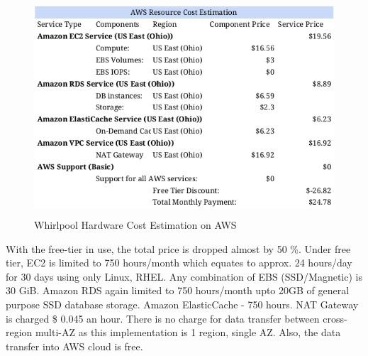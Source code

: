 \begin{figure}[h!]
  \centering
  \includegraphics[width=12cm,height=8cm,keepaspectratio]{../media/crawler/aws-resource-cost-estimation.png}
  \caption{Whirlpool Hardware Cost Estimation on AWS}
  \label{fig:awscost}
\end{figure}

\noindent
With the free-tier in use, the total price is dropped almost by 50 \%. Under free tier, EC2 is limited to 750 hours/month which equates to approx. 24 hours/day for 30 days using only Linux, RHEL. Any combination of EBS (SSD/Magnetic) is 30 GiB. Amazon RDS again limited to 750 hours/month upto 20GB of general purpose SSD database
storage. Amazon ElasticCache - 750 hours. NAT Gateway is charged \$ 0.045 an hour. There is no charge for data transfer between cross-region multi-AZ as this implementation is 1 region, single AZ. Also, the data 
transfer into AWS cloud is free.

\pagebreak